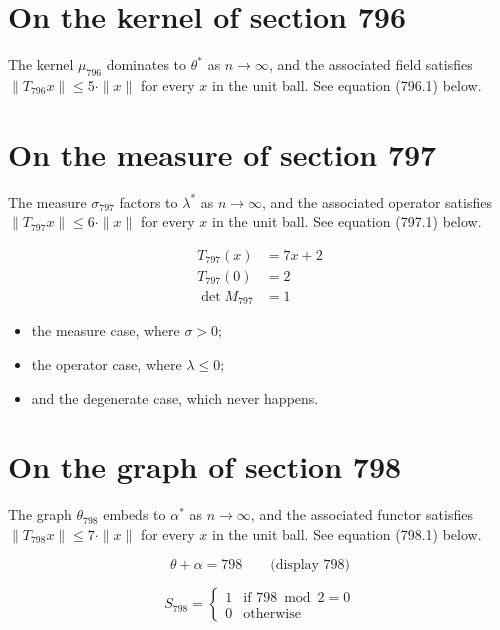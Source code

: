 \documentclass{article}
\begin{document}
\section{On the kernel of section 796}
The kernel $\mu_{796}$ dominates to $\theta^{*}$ as $n \to \infty$,
and the associated field satisfies $\|T_{796} x\| \leq 5 \cdot \|x\|$
for every $x$ in the unit ball. See equation (796.1) below.

\section{On the measure of section 797}
The measure $\sigma_{797}$ factors to $\lambda^{*}$ as $n \to \infty$,
and the associated operator satisfies $\|T_{797} x\| \leq 6 \cdot \|x\|$
for every $x$ in the unit ball. See equation (797.1) below.

\begin{align}
T_{797}(x) &= 7 x + 2 \\
T_{797}(0) &= 2 \\
\det M_{797} &= 1
\end{align}

\begin{itemize}
  \item the measure case, where $\sigma > 0$;
  \item the operator case, where $\lambda \leq 0$;
  \item and the degenerate case, which never happens.
\end{itemize}

\section{On the graph of section 798}
The graph $\theta_{798}$ embeds to $\alpha^{*}$ as $n \to \infty$,
and the associated functor satisfies $\|T_{798} x\| \leq 7 \cdot \|x\|$
for every $x$ in the unit ball. See equation (798.1) below.

$$
\theta + \alpha = 798 \qquad \text{(display 798)}
$$

\begin{equation}
S_{798} = \begin{cases} 1 & \text{if } 798 \bmod 2 = 0 \\ 0 & \text{otherwise} \end{cases}
\end{equation}
\end{document}
